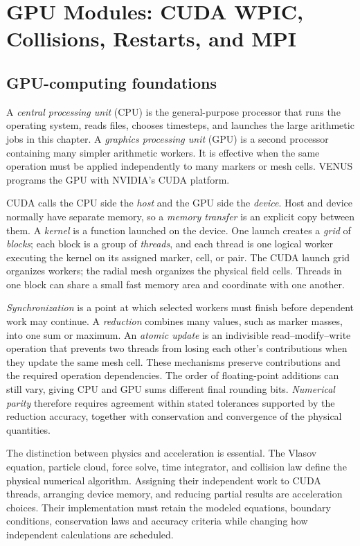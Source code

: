 \section{GPU Modules: CUDA WPIC, Collisions, Restarts, and MPI}
\label{sec:gpu-modules}

\subsection{GPU-computing foundations}

A \emph{central processing unit} (CPU) is the general-purpose processor that
runs the operating system, reads files, chooses timesteps, and launches the
large arithmetic jobs in this chapter.  A \emph{graphics processing unit}
(GPU) is a second processor containing many simpler arithmetic workers.  It is
effective when the same operation must be applied independently to many
markers or mesh cells.  VENUS programs the GPU with NVIDIA's CUDA platform.

CUDA calls the CPU side the \emph{host} and the GPU side the \emph{device}.
Host and device normally have separate memory, so a \emph{memory transfer} is
an explicit copy between them.  A \emph{kernel} is a function launched on the
device.  One launch creates a \emph{grid} of \emph{blocks}; each block is a
group of \emph{threads}, and each thread is one logical worker executing the
kernel on its assigned marker, cell, or pair.  The CUDA launch grid organizes
workers; the radial mesh organizes the physical field cells. Threads in one
block can share a small fast memory area and coordinate with one another.

\emph{Synchronization} is a point at which selected workers must finish
before dependent work may continue.  A \emph{reduction} combines many values,
such as marker masses, into one sum or maximum.  An \emph{atomic update} is an
indivisible read--modify--write operation that prevents two threads from
losing each other's contributions when they update the same mesh cell.  These
mechanisms preserve contributions and the required operation dependencies.
The order of floating-point additions can still vary, giving CPU and GPU sums
different final rounding bits. \emph{Numerical parity} therefore requires
agreement within stated tolerances supported by the reduction accuracy,
together with conservation and convergence of the physical quantities.

The distinction between physics and acceleration is essential.  The Vlasov
equation, particle cloud, force solve, time integrator, and collision law
define the physical numerical algorithm.  Assigning their independent work
to CUDA threads, arranging device memory, and reducing partial results are
acceleration choices. Their implementation must retain the modeled equations,
boundary conditions, conservation laws and accuracy criteria while changing
how independent calculations are scheduled.

